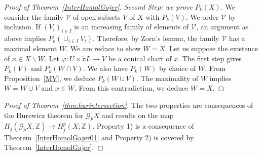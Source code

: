 \documentclass[a4paper,10pt,english,reqno]{amsart}
\theoremstyle{plain}
\theoremstyle{definition}
\theoremstyle{remark}
\numberwithin{equation}{section}
\newcommand{\thmref}[1]{Theorem~\ref{#1}}
\newcommand{\propref}[1]{Proposition~\ref{#1}}
\def\ov{\overline}
\def\cV{{\mathcal V}}
\def\crG{{\mathscr G}}
\def\tc{{\mathtt c}}
\def\Z{\mathbb{Z}}
\def\rc{{\mathring{\tc}}}
\def\menos{\backslash}
\renewcommand\1{\hbox{\ding{192}}}
\renewcommand\2{\hbox{\ding{193}}}
\newcommand\3{\hbox{\ding{194}}}
\newcommand\4{\hbox{\ding{195}}}
\begin{document}
\begin{proof}[Proof of \thmref{InterHomolGajer}]
%
\emph{Second Step:  we prove $P_k(X)$.}
We consider the family $\cV$ of open subsets $V$ of $X$ with $P_{k}(V)$. 
We order $\cV$ by inclusion. 
If $(V_{i})_{i\in I}$ is an increasing family of elements of $\cV$, an argument as above implies 
 $P_{k}(\cup_{i\in I}V_{i})$.
 Therefore, by Zorn's lemma, the family $\cV$ has a maximal element $W$.
We are reduce to show  $W = X$. Let us suppose  the existence of  $x\in X\menos W$. 
Let $\varphi \colon U \times \rc L \to V$ be a conical chart of $x$. 
The first step gives $P_k(V)$ and $P_k(W \cap V)$. We also  have $P_k(W)$ by choice of $W$. 
From \propref{MV}, we deduce $P_k(W\cup V)$.
The maximality of $W$ implies $W=W\cup V$ and $x \in W$. From this contradiction, we deduce $W=X$.
\end{proof}

\begin{proof}[Proof of \thmref{thm:hurintersection}]
The two properties are consequences of the Hurewicz theorem for $\crG_{\ov{p}}X$ and results on the map
$H_j (\crG_{\ov{p}}X;\Z){\longrightarrow} H_j^{\ov p}(X;\Z)$. 
Property 1) is a consequence of \thmref{InterHomolGajer01} and
%
Property 2) is covered by \thmref{InterHomolGajer}.
\end{proof}
\end{document}

